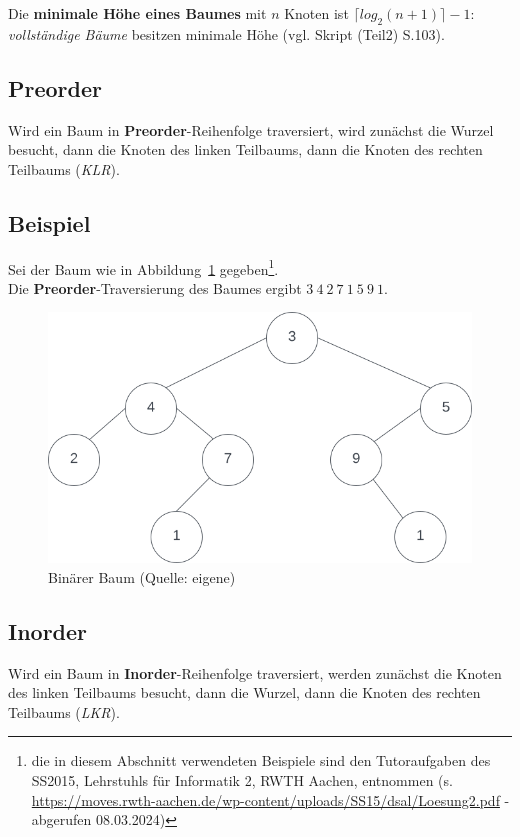 \noindent
Die \textbf{minimale Höhe eines Baumes}  mit $n$ Knoten ist $\lceil log_2(n + 1) \rceil - 1$: \textit{vollständige Bäume} besitzen minimale Höhe (vgl. Skript (Teil2) S.103).\\


\subsection{Preorder}
Wird ein Baum in \textbf{Preorder}-Reihenfolge traversiert, wird zunächst die Wurzel besucht, dann die Knoten des linken Teilbaums, dann die Knoten des rechten Teilbaums (\textit{KLR}).


\subsection*{Beispiel}
Sei der Baum wie in Abbildung~\ref{fig:bintree} gegeben\footnote{
die in diesem Abschnitt verwendeten Beispiele sind den Tutoraufgaben des SS2015, Lehrstuhls für Informatik 2, RWTH Aachen, entnommen (s. \url{https://moves.rwth-aachen.de/wp-content/uploads/SS15/dsal/Loesung2.pdf} - abgerufen 08.03.2024)
}.\\

\noindent
Die \textbf{Preorder}-Traversierung des Baumes ergibt  $3\ 4\ 2\ 7\ 1\ 5\ 9\ 1$.

\begin{figure}
    \begin{center}
        \includegraphics[scale=0.4]{chapters/Datenstrukturen und Algorithmen/img/bintree}
        \caption{Binärer Baum (Quelle: eigene)}
        \label{fig:bintree}
    \end{center}
\end{figure}

\subsection{Inorder}
Wird ein Baum in \textbf{Inorder}-Reihenfolge traversiert, werden zunächst die Knoten des linken Teilbaums besucht, dann die Wurzel, dann die Knoten des rechten Teilbaums (\textit{LKR}).

